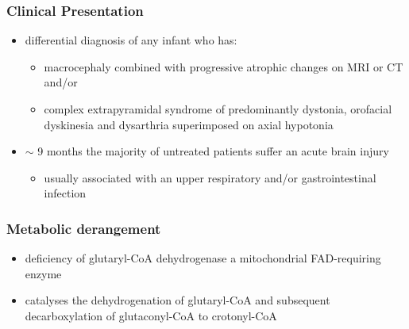\documentclass{scrartcl}
\begin{document}
\subsubsection{Clinical Presentation}
\label{sec:org60695c4}
\begin{itemize}
\item differential diagnosis of any infant who has:
\begin{itemize}
\item macrocephaly combined with progressive atrophic changes on MRI or CT and/or
\item complex extrapyramidal syndrome of predominantly dystonia,
orofacial dyskinesia and dysarthria superimposed on axial hypotonia
\end{itemize}
\item \(\sim\) 9 months the majority of untreated patients suffer an acute
brain injury
\begin{itemize}
\item usually associated with an upper respiratory and/or
gastrointestinal infection
\end{itemize}
\end{itemize}
\subsubsection{Metabolic derangement}
\label{sec:org6f14dbc}
\begin{itemize}
\item deficiency of glutaryl-CoA dehydrogenase a mitochondrial
FAD-requiring enzyme
\item catalyses the dehydrogenation of glutaryl-CoA and subsequent
decarboxylation of glutaconyl-CoA to crotonyl-CoA
\end{itemize}
\end{document}
